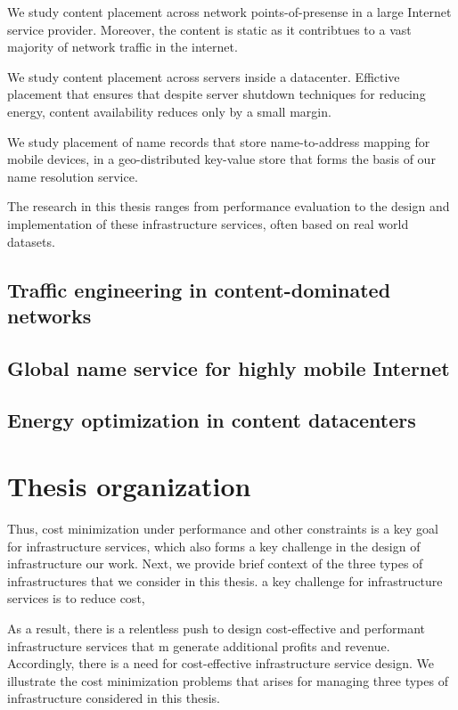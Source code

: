We study content placement across network points-of-presense in a large Internet service provider. Moreover, the content is static as it contribtues to a vast majority of network traffic in the internet.

We study content placement across servers inside a datacenter. Effictive placement that ensures that despite server shutdown techniques for reducing energy, content availability reduces only by a small margin.

We study placement of name records that store name-to-address mapping for mobile devices, in a geo-distributed key-value store that forms the basis of our name resolution service.

The research in this thesis ranges from performance evaluation to the design and implementation of these infrastructure services, often based on real world datasets.


\subsection{Traffic engineering in content-dominated networks}


\subsection{Global name service for highly mobile Internet}


\subsection{Energy optimization in content datacenters}



\section{Thesis organization}


Thus, cost minimization under performance and other constraints is a key goal for infrastructure services, which also 
forms a key challenge in the design of infrastructure our work. Next, we provide brief context of the three types of infrastructures that we consider in this thesis.
 a key challenge for infrastructure services is to reduce cost, 

As a result, there is a relentless push to design cost-effective and performant infrastructure services that m
generate additional profits and revenue. 
Accordingly, there is a need for cost-effective infrastructure service design. 
We illustrate the cost minimization problems that arises for managing three types of infrastructure considered in this thesis. 

